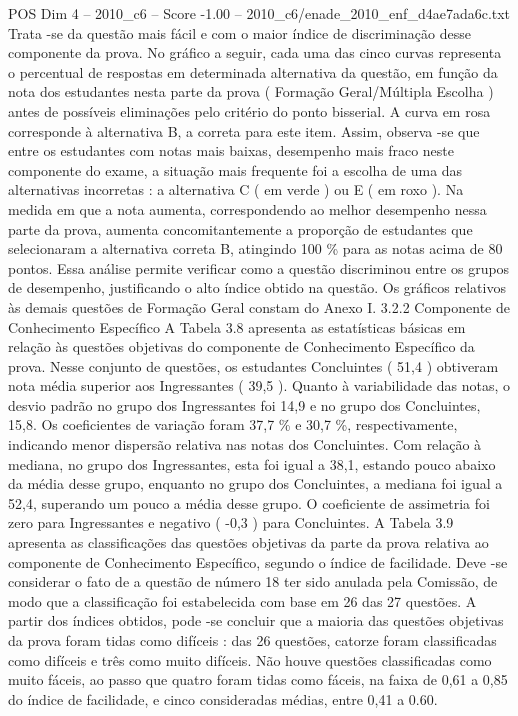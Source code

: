 \begin{textsample}{POS Dim 4 – 2010\_c6 – Score -1.00 – 2010\_c6/enade\_2010\_enf\_d4ae7ada6c.txt}
Trata -se da questão mais fácil e com o maior índice de discriminação desse componente da prova.
No gráfico a seguir, cada uma das cinco curvas representa o percentual de respostas em determinada alternativa da questão, em função da nota dos estudantes nesta parte da prova ( Formação Geral/Múltipla Escolha ) antes de possíveis eliminações pelo critério do ponto bisserial.
A curva em rosa corresponde à alternativa B, a correta para este item.
Assim, observa -se que entre os estudantes com notas mais baixas, desempenho mais fraco neste componente do exame, a situação mais frequente foi a escolha de uma das alternativas incorretas : a alternativa C ( em verde ) ou E ( em roxo ).
Na medida em que a nota aumenta, correspondendo ao melhor desempenho nessa parte da prova, aumenta concomitantemente a proporção de estudantes que selecionaram a alternativa correta B, atingindo 100 \% para as notas acima de 80 pontos.
Essa análise permite verificar como a questão discriminou entre os grupos de desempenho, justificando o alto índice obtido na questão.
Os gráficos relativos às demais questões de Formação Geral constam do Anexo I. 3.2.2 Componente de Conhecimento Específico A Tabela 3.8 apresenta as estatísticas básicas em relação às questões objetivas do componente de Conhecimento Específico da prova.
Nesse conjunto de questões, os estudantes Concluintes ( 51,4 ) obtiveram nota média superior aos Ingressantes ( 39,5 ).
Quanto à variabilidade das notas, o desvio padrão no grupo dos Ingressantes foi 14,9 e no grupo dos Concluintes, 15,8.
Os coeficientes de variação foram 37,7 \% e 30,7 \%, respectivamente, indicando menor dispersão relativa nas notas dos Concluintes.
Com relação à mediana, no grupo dos Ingressantes, esta foi igual a 38,1, estando pouco abaixo da média desse grupo, enquanto no grupo dos Concluintes, a mediana foi igual a 52,4, superando um pouco a média desse grupo.
O coeficiente de assimetria foi zero para Ingressantes e negativo ( -0,3 ) para Concluintes.
A Tabela 3.9 apresenta as classificações das questões objetivas da parte da prova relativa ao componente de Conhecimento Específico, segundo o índice de facilidade.
Deve -se considerar o fato de a questão de número 18 ter sido anulada pela Comissão, de modo que a classificação foi estabelecida com base em 26 das 27 questões.
A partir dos índices obtidos, pode -se concluir que a maioria das questões objetivas da prova foram tidas como difíceis : das 26 questões, catorze foram classificadas como difíceis e três como muito difíceis.
Não houve questões classificadas como muito fáceis, ao passo que quatro foram tidas como fáceis, na faixa de 0,61 a 0,85 do índice de facilidade, e cinco consideradas médias, entre 0,41 a 0.60.

\end{textsample}
